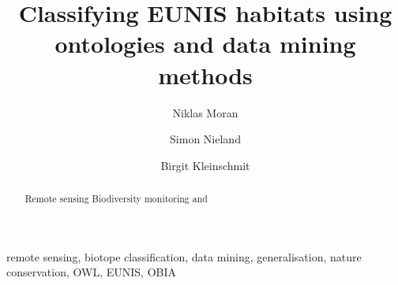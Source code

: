 \documentclass[authoryear, review,12pt,number]{elsarticle}
\begin{document}



\begin{frontmatter}
\linenumbers
\title{Classifying EUNIS habitats using ontologies and data mining methods}


\author[TUB]{Niklas Moran}

\author[TUB]{Simon Nieland}
\author[TUB]{Birgit Kleinschmit}


\address[TUB]{Geoinformation in Environmental Planning Lab, Technische
Universit\"at Berlin, Stra\ss e des 17. Juni 145, 10623 Berlin, Germany}


\begin{abstract}
Remote sensing Biodiversity monitoring and 
\end{abstract}

\begin{keyword}
remote sensing, biotope classification, data mining,
generalisation, nature conservation, OWL, EUNIS, OBIA
\end{keyword}

\end{frontmatter}

\linenumbers
\end{document}
